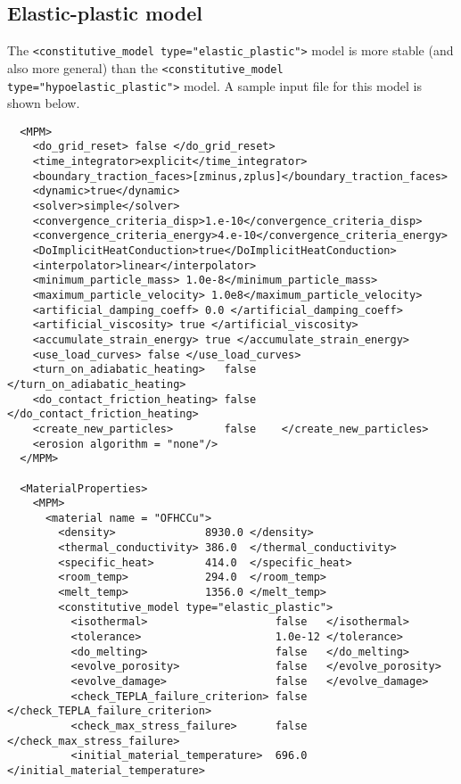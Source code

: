   \subsection{Elastic-plastic model}
  The \verb|<constitutive_model type="elastic_plastic">| model is more stable
  (and also more general)
  than the \verb|<constitutive_model type="hypoelastic_plastic">| model.  A
  sample input file for this model is shown below.
  \begin{verbatim}
  <MPM>
    <do_grid_reset> false </do_grid_reset>
    <time_integrator>explicit</time_integrator>
    <boundary_traction_faces>[zminus,zplus]</boundary_traction_faces> 
    <dynamic>true</dynamic>
    <solver>simple</solver>
    <convergence_criteria_disp>1.e-10</convergence_criteria_disp>
    <convergence_criteria_energy>4.e-10</convergence_criteria_energy>
    <DoImplicitHeatConduction>true</DoImplicitHeatConduction>
    <interpolator>linear</interpolator>
    <minimum_particle_mass> 1.0e-8</minimum_particle_mass>
    <maximum_particle_velocity> 1.0e8</maximum_particle_velocity>
    <artificial_damping_coeff> 0.0 </artificial_damping_coeff>
    <artificial_viscosity> true </artificial_viscosity>
    <accumulate_strain_energy> true </accumulate_strain_energy>
    <use_load_curves> false </use_load_curves>
    <turn_on_adiabatic_heating>   false    </turn_on_adiabatic_heating>
    <do_contact_friction_heating> false    </do_contact_friction_heating>
    <create_new_particles>        false    </create_new_particles>
    <erosion algorithm = "none"/>
  </MPM>

  <MaterialProperties>
    <MPM>
      <material name = "OFHCCu">
        <density>              8930.0 </density>
        <thermal_conductivity> 386.0  </thermal_conductivity>
        <specific_heat>        414.0  </specific_heat>
        <room_temp>            294.0  </room_temp>
        <melt_temp>            1356.0 </melt_temp>
        <constitutive_model type="elastic_plastic">
          <isothermal>                    false   </isothermal>
          <tolerance>                     1.0e-12 </tolerance>
          <do_melting>                    false   </do_melting>
          <evolve_porosity>               false   </evolve_porosity>
          <evolve_damage>                 false   </evolve_damage>
          <check_TEPLA_failure_criterion> false   </check_TEPLA_failure_criterion>
          <check_max_stress_failure>      false   </check_max_stress_failure>
          <initial_material_temperature>  696.0   </initial_material_temperature>
          

\end{verbatim}

